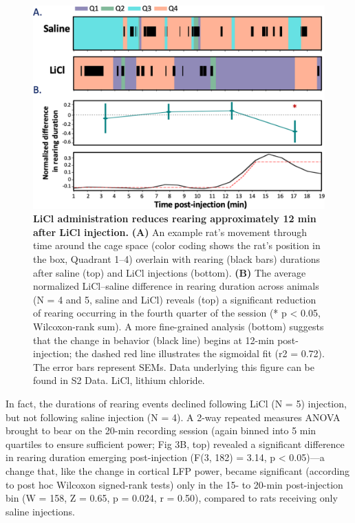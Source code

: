 \begin{refsection}
{\begin{figure}
\includegraphics[width=\linewidth]{stone_2022_figs/journal.pbio.3001537.g003.png} 
\caption{\textbf{LiCl administration reduces rearing approximately 12 min after LiCl injection.} \textbf{(A)} An example rat’s movement through time around the cage space (color coding shows the rat’s position in the box, Quadrant 1–4) overlain with rearing (black bars) durations after saline (top) and LiCl injections (bottom). \textbf{(B)} The average normalized LiCl–saline difference in rearing duration across animals (N = 4 and 5, saline and LiCl) reveals (top) a significant reduction of rearing occurring in the fourth quarter of the session (* p < 0.05, Wilcoxon-rank sum). A more fine-grained analysis (bottom) suggests that the change in behavior (black line) begins at 12-min post-injection; the dashed red line illustrates the sigmoidal fit (r2 = 0.72). The error bars represent SEMs. Data underlying this figure can be found in S2 Data. LiCl, lithium chloride.
}
\label{fig:wrapfig}
\end{figure}



In fact, the durations of rearing events declined following LiCl (N = 5) injection, but not following saline injection (N = 4). A 2-way repeated measures ANOVA brought to bear on the 20-min recording session (again binned into 5 min quartiles to ensure sufficient power; Fig 3B, top) revealed a significant difference in rearing duration emerging post-injection (F(3, 182) = 3.14, p < 0.05)—a change that, like the change in cortical LFP power, became significant (according to post hoc Wilcoxon signed-rank tests) only in the 15- to 20-min post-injection bin (W = 158, Z = 0.65, p = 0.024, r = 0.50), compared to rats receiving only saline injections.

}
\end{refsection}
